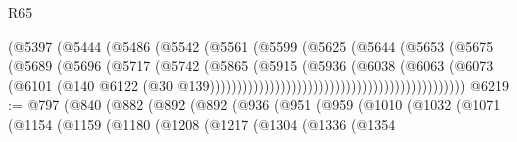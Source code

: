 \begin{lexlean}{R65}
\begin{coremodule}
{                                                    (@5397
                                                      (@5444
                                                        (@5486
                                                          (@5542
                                                            (@5561
                                                              (@5599
                                                                (@5625
                                                                  (@5644
                                                                    (@5653
                                                                      (@5675
                                                                        (@5689
                                                                          (@5696
                                                                            (@5717
                                                                              (@5742
                                                                                (@5865
                                                                                  (@5915
                                                                                    (@5936
                                                                                      (@6038
                                                                                        (@6063
                                                                                          (@6073
                                                                                            (@6101
                                                                                              (@140
                                                                                                @6122
                                                                                                (@30
                                                                                                  @139)))))))))))))))))))))))))))))))))))))))))))))))
@6219 := @797
    (@840
      (@882
        (@892
          (@892
            (@936
              (@951
                (@959
                  (@1010
                    (@1032
                      (@1071
                        (@1154
                          (@1159
                            (@1180
                              (@1208
                                (@1217
                                  (@1304
                                    (@1336
                                      (@1354
}
\end{coremodule}
\end{lexlean}
